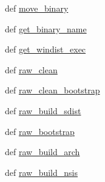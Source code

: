 \begin{DoxyCompactItemize}
def \hyperlink{namespacepavement_abdc0b417fe3411a7317ef9cff5c7bfa2}{move\+\_\+binary}
\item 
def \hyperlink{namespacepavement_abb47025b0fd9fa6bd5bb8ef1c9d389d2}{get\+\_\+binary\+\_\+name}
\item 
def \hyperlink{namespacepavement_af05635e94ee75f4aa320b9cf89417c9c}{get\+\_\+windist\+\_\+exec}
\item 
def \hyperlink{namespacepavement_ab9b22cb50bfc326d0d01b7b0db74d134}{raw\+\_\+clean}
\item 
def \hyperlink{namespacepavement_a90c438e51752b119f1b70fe73a034070}{raw\+\_\+clean\+\_\+bootstrap}
\item 
def \hyperlink{namespacepavement_acda38ce93ad591f88a117eedf2bc578d}{raw\+\_\+build\+\_\+sdist}
\item 
def \hyperlink{namespacepavement_a0c8cdc843468b67fcdbfee3d28ccba71}{raw\+\_\+bootstrap}
\item 
def \hyperlink{namespacepavement_a3638544b6ac6567d4346bf8870a55d5d}{raw\+\_\+build\+\_\+arch}
\item 
def \hyperlink{namespacepavement_a29c7b5e70597fd6192f7c987a064a5df}{raw\+\_\+build\+\_\+nsis}
\end{DoxyCompactItemize}
